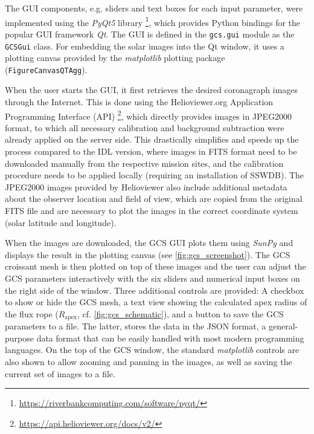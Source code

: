 The \ac{GUI} components, e.g. sliders and text boxes for each input parameter, were implemented using the \textit{PyQt5} library \footnote{\url{https://riverbankcomputing.com/software/pyqt/}}, which provides Python bindings for the popular \ac{GUI} framework \textit{Qt}. The \ac{GUI} is defined in the \texttt{gcs.gui} module as the \texttt{GCSGui} class. For embedding the solar images into the Qt window, it uses a plotting canvas provided by the \textit{matplotlib} plotting package (\texttt{FigureCanvasQTAgg}).

When the user starts the \ac{GUI}, it first retrieves the desired coronagraph images through the Internet. This is done using the Helioviewer.org Application Programming Interface (API) \footnote{\url{https://api.helioviewer.org/docs/v2/}}, which directly provides images in JPEG2000 format, to which all necessary calibration and background subtraction were already applied on the server side. This drastically simplifies and speeds up the process compared to the \ac{IDL} version, where images in FITS format need to be downloaded manually from the respective mission sites, and the calibration procedure needs to be applied locally (requiring an installation of SSWDB). The JPEG2000 images provided by Helioviewer also include additional metadata about the observer location and field of view, which are copied from the original FITS file and are necessary to plot the images in the correct coordinate system (solar latitude and longitude).

When the images are downloaded, the \ac{GCS} \ac{GUI} plots them using \textit{SunPy} and displays the result in the plotting canvas (see \autoref{fig:gcs_screenshot}). The \ac{GCS} croissant mesh is then plotted on top of these images and the user can adjust the \ac{GCS} parameters interactively with the six sliders and numerical input boxes on the right side of the window. Three additional controls are provided: A checkbox to show or hide the \ac{GCS} mesh, a text view showing the calculated apex radius of the flux rope ($R_\text{apex}$, cf. \autoref{fig:gcs_schematic}), and a button to save the \ac{GCS} parameters to a file. The latter, stores the data in the \ac{JSON} format, a general-purpose data format that can be easily handled with most modern programming languages. On the top of the \ac{GCS} window, the standard \textit{matplotlib} controls are also shown to allow zooming and panning in the images, as well as saving the current set of images to a file.

